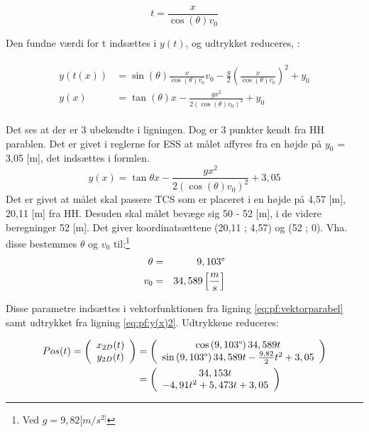 \begin{equation}
t = \frac{x}{\cos \left( \theta \right) v_0}
\label{eq:pf:x(t)}
\end{equation}

Den fundne værdi for t indsættes i \(y(t)\), og udtrykket reduceres, \citep[Side. 67]{fund_of_physics}: 

\begin{align}
\begin{split}
y(t(x)) &= \sin \left( \theta \right) \frac{x}{\cos \left( \theta \right) v_0} v_0 - \frac{g}{2} \left(\frac{x}{\cos \left( \theta \right) v_0}\right)^2 + y_0 \\
y(x) &= \tan \left( \theta \right) x - \frac{gx^2}{2(\cos \left( \theta \right) v_0)^2} + y_0
\label{eq:pf:y(x(t))}
\end{split}
\end{align}

Det ses at der er 3 ubekendte i ligningen. Dog er 3 punkter kendt fra HH parablen. Det er givet i reglerne for ESS at målet affyres fra en højde på \(y_0\) = 3,05 [m], det indsættes i formlen. 
\begin{equation}
y(x) = \tan \theta x - \frac{gx^2}{2(\cos \left( \theta \right)  v_0)^2} + 3,05
\label{eq:pf:y(x)2}
\end{equation}
Det er givet at målet skal passere TCS som er placeret i en højde på 4,57 [m], 20,11 [m] fra HH. 
Desuden skal målet bevæge sig 50 - 52 [m], i de videre beregninger 52 [m]. Det giver koordinatsættene (20,11 ; 4,57) og (52 ; 0). Vha. disse bestemmes \(\theta\) og \(v_0\) til:\footnote{Ved \(g = 9,82[m/{s}^{2]}\)}
\begin{eqnarray}
\theta &=& 9,103 \degree \\
v_0 &=& 34,589 \left[ \frac { m }{ s }  \right] 
\end{eqnarray}

Disse parametre indsættes i vektorfunktionen fra ligning \ref{eq:pf:vektorparabel} samt udtrykket fra ligning \ref{eq:pf:y(x)2}. Udtrykkene reduceres: 

\begin{align}
\begin{split}
	Pos(t) = \left( \begin{array}{c}
	x_{2D}(t) \\
	y_{2D}(t)
	\end{array}
	\right)
	&= \left( \begin{array}{c}
	\cos \left(9,103 \degree \right) 34,589 t \\
	\sin \left(9,103 \degree \right) 34,589 t - \frac{9,82}{2} t^2 + 3,05
	\end{array}
	\right) \\
	&= \left( \begin{array}{c}
	34,153 t \\
	- 4,91 t^2 + 5,473 t + 3,05
	\end{array}
	\right)
\label{eq:pf:vektorparabel2}
\end{split}
\end{align}


